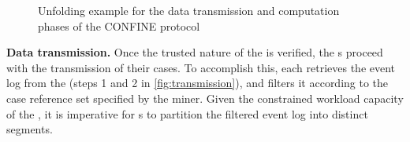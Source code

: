 \begin{figure}[t]
	\hfill
	\hfill	
	\caption{Unfolding example for the data transmission and computation phases of the CONFINE protocol}
	\label{fig:workflow}
\end{figure}
\noindent\textbf{Data transmission.} Once the trusted nature of the  is verified, the s proceed with the transmission of their cases. To accomplish this, each  retrieves the event log from the  (steps 1 and 2 in \cref{fig:transmission}), and filters it according to the case reference set specified by the miner. Given the constrained workload capacity of the , it is imperative for s to partition the filtered event log into distinct segments. %
